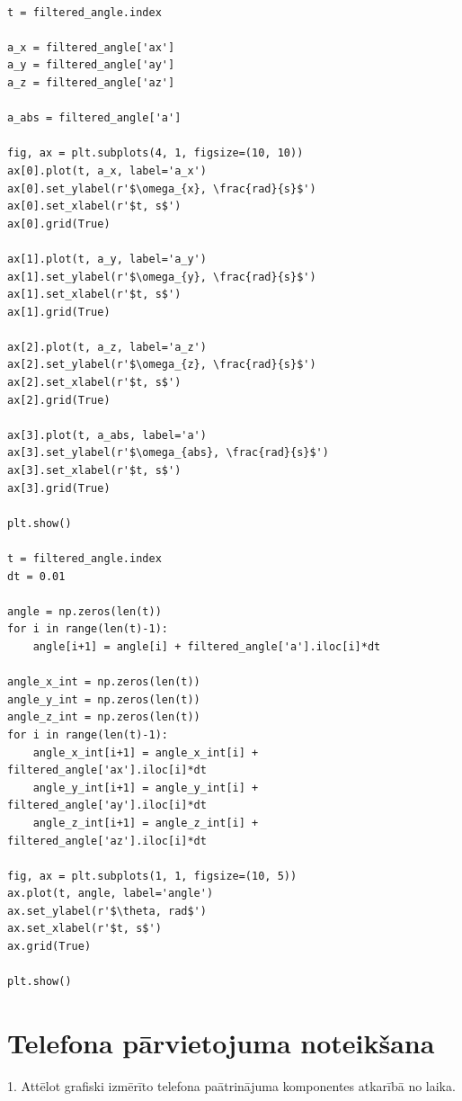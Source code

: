 \documentclass[12pt]{article}
\begin{document}
\begin{center}
\begin{verbatim}

t = filtered_angle.index

a_x = filtered_angle['ax']
a_y = filtered_angle['ay']
a_z = filtered_angle['az']

a_abs = filtered_angle['a']

fig, ax = plt.subplots(4, 1, figsize=(10, 10))
ax[0].plot(t, a_x, label='a_x')
ax[0].set_ylabel(r'$\omega_{x}, \frac{rad}{s}$')
ax[0].set_xlabel(r'$t, s$')
ax[0].grid(True)

ax[1].plot(t, a_y, label='a_y')
ax[1].set_ylabel(r'$\omega_{y}, \frac{rad}{s}$')
ax[1].set_xlabel(r'$t, s$')
ax[1].grid(True)

ax[2].plot(t, a_z, label='a_z')
ax[2].set_ylabel(r'$\omega_{z}, \frac{rad}{s}$')
ax[2].set_xlabel(r'$t, s$')
ax[2].grid(True)

ax[3].plot(t, a_abs, label='a')
ax[3].set_ylabel(r'$\omega_{abs}, \frac{rad}{s}$')
ax[3].set_xlabel(r'$t, s$')
ax[3].grid(True)

plt.show()

t = filtered_angle.index
dt = 0.01

angle = np.zeros(len(t))
for i in range(len(t)-1):
    angle[i+1] = angle[i] + filtered_angle['a'].iloc[i]*dt

angle_x_int = np.zeros(len(t))
angle_y_int = np.zeros(len(t))
angle_z_int = np.zeros(len(t))
for i in range(len(t)-1):
    angle_x_int[i+1] = angle_x_int[i] + filtered_angle['ax'].iloc[i]*dt
    angle_y_int[i+1] = angle_y_int[i] + filtered_angle['ay'].iloc[i]*dt
    angle_z_int[i+1] = angle_z_int[i] + filtered_angle['az'].iloc[i]*dt

fig, ax = plt.subplots(1, 1, figsize=(10, 5))
ax.plot(t, angle, label='angle')
ax.set_ylabel(r'$\theta, rad$')
ax.set_xlabel(r'$t, s$')
ax.grid(True)

plt.show()

\end{verbatim}
\end{center}

\section*{Telefona pārvietojuma noteikšana}

1.	Attēlot grafiski izmērīto telefona paātrinājuma komponentes atkarībā no laika.
\end{document}
